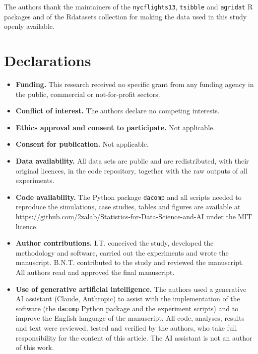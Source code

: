 \backmatter

The authors thank the maintainers of the \texttt{nycflights13}, \texttt{tsibble} and \texttt{agridat} R packages and of the Rdatasets collection for making the data used in this study openly available.

\section*{Declarations}

\begin{itemize}
\item \textbf{Funding.} This research received no specific grant from any funding agency in the public, commercial or not-for-profit sectors.
\item \textbf{Conflict of interest.} The authors declare no competing interests.
\item \textbf{Ethics approval and consent to participate.} Not applicable.
\item \textbf{Consent for publication.} Not applicable.
\item \textbf{Data availability.} All data sets are public and are redistributed, with their original licences, in the code repository, together with the raw outputs of all experiments.
\item \textbf{Code availability.} The Python package \texttt{dacomp} and all scripts needed to reproduce the simulations, case studies, tables and figures are available at \url{https://github.com/2zalab/Statistics-for-Data-Science-and-AI} under the MIT licence.
\item \textbf{Author contributions.} I.T. conceived the study, developed the methodology and software, carried out the experiments and wrote the manuscript. B.N.T. contributed to the study and reviewed the manuscript. All authors read and approved the final manuscript.
\item \textbf{Use of generative artificial intelligence.} The authors used a generative AI assistant (Claude, Anthropic) to assist with the implementation of the software (the \texttt{dacomp} Python package and the experiment scripts) and to improve the English language of the manuscript. All code, analyses, results and text were reviewed, tested and verified by the authors, who take full responsibility for the content of this article. The AI assistant is not an author of this work.
\end{itemize}
